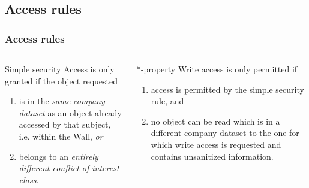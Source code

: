 \documentclass[10pt]{beamer}
\begin{document}
\subsection{Access rules}
\begin{frame}
	\frametitle{Access rules}
	
	\begin{columns}
		\begin{column}{.45\textwidth}
			\begin{block}{Simple security}
				Access is only granted if the object requested
				\begin{enumerate}
					\item is in the \textit{same company dataset} as an object already accessed by that subject, i.e. within the Wall, \textit{or}
					\item belongs to an \textit{entirely different conflict of interest class}.
				\end{enumerate}
			\end{block}
		\end{column}
		\begin{column}{.45\textwidth}
			\begin{block}{*-property}
				Write access is only permitted if
				\begin{enumerate}
					\item access is permitted by the simple security rule, and
					\item no object can be read which is in a different company dataset to the one for which write access is requested and contains unsanitized information.
				\end{enumerate}
			\end{block}
		\end{column}
	\end{columns}
\end{frame}


{\aauwavesbg
\begin{frame}
\end{frame}}
\end{document}
